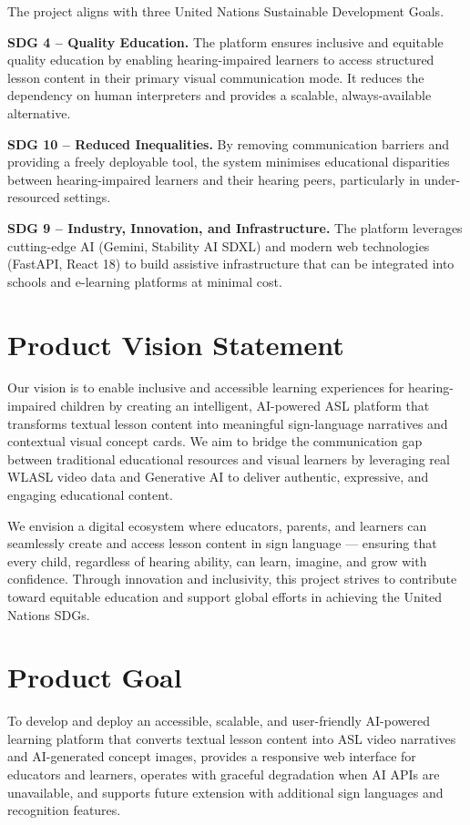\documentclass[12pt,a4paper,oneside]{report}
\begin{document}
The project aligns with three United Nations Sustainable Development Goals.

\textbf{SDG 4 -- Quality Education.} The platform ensures inclusive and equitable quality education by enabling hearing-impaired learners to access structured lesson content in their primary visual communication mode. It reduces the dependency on human interpreters and provides a scalable, always-available alternative.

\textbf{SDG 10 -- Reduced Inequalities.} By removing communication barriers and providing a freely deployable tool, the system minimises educational disparities between hearing-impaired learners and their hearing peers, particularly in under-resourced settings.

\textbf{SDG 9 -- Industry, Innovation, and Infrastructure.} The platform leverages cutting-edge AI (Gemini, Stability AI SDXL) and modern web technologies (FastAPI, React 18) to build assistive infrastructure that can be integrated into schools and e-learning platforms at minimal cost.

\section{Product Vision Statement}

Our vision is to enable inclusive and accessible learning experiences for hearing-impaired children by creating an intelligent, AI-powered ASL platform that transforms textual lesson content into meaningful sign-language narratives and contextual visual concept cards. We aim to bridge the communication gap between traditional educational resources and visual learners by leveraging real WLASL video data and Generative AI to deliver authentic, expressive, and engaging educational content.

We envision a digital ecosystem where educators, parents, and learners can seamlessly create and access lesson content in sign language --- ensuring that every child, regardless of hearing ability, can learn, imagine, and grow with confidence. Through innovation and inclusivity, this project strives to contribute toward equitable education and support global efforts in achieving the United Nations SDGs.

\section{Product Goal}

To develop and deploy an accessible, scalable, and user-friendly AI-powered learning platform that converts textual lesson content into ASL video narratives and AI-generated concept images, provides a responsive web interface for educators and learners, operates with graceful degradation when AI APIs are unavailable, and supports future extension with additional sign languages and recognition features.
\end{document}
